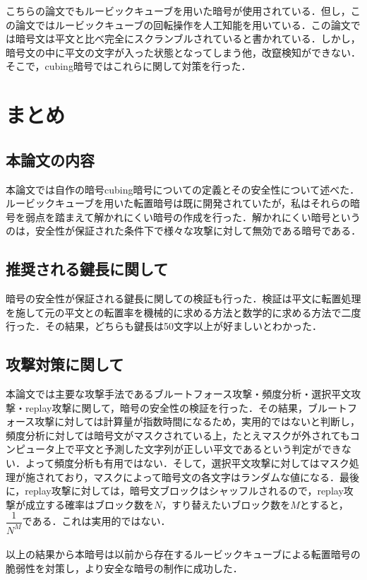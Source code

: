 \documentclass[a4p]{jarticle}
\begin{document}
こちらの論文\cite{Scrambling algorithm}でもルービックキューブを用いた暗号が使用されている．但し，この論文ではルービックキューブの回転操作を人工知能を用いている．この論文では暗号文は平文と比べ完全にスクランブルされていると書かれている．しかし，暗号文の中に平文の文字が入った状態となってしまう他，改竄検知ができない．そこで，cubing暗号ではこれらに関して対策を行った．


\section{まとめ}

\subsection{本論文の内容}
本論文では自作の暗号cubing暗号についての定義とその安全性について述べた．ルービックキューブを用いた転置暗号は既に開発されていたが，私はそれらの暗号を弱点を踏まえて解かれにくい暗号の作成を行った．解かれにくい暗号というのは，安全性が保証された条件下で様々な攻撃に対して無効である暗号である．

\subsection{推奨される鍵長に関して}
暗号の安全性が保証される鍵長に関しての検証も行った．検証は平文に転置処理を施して元の平文との転置率を機械的に求める方法と数学的に求める方法で二度行った．その結果，どちらも鍵長は50文字以上が好ましいとわかった．

\subsection{攻撃対策に関して}
本論文では主要な攻撃手法であるブルートフォース攻撃・頻度分析・選択平文攻撃・replay攻撃に関して，暗号の安全性の検証を行った．その結果，ブルートフォース攻撃に対しては計算量が指数時間になるため，実用的ではないと判断し，頻度分析に対しては暗号文がマスクされている上，たとえマスクが外されてもコンピュータ上で平文と予測した文字列が正しい平文であるという判定ができない．よって頻度分析も有用ではない．そして，選択平文攻撃に対してはマスク処理が施されており，マスクによって暗号文の各文字はランダムな値になる．最後に，replay攻撃に対しては，暗号文ブロックはシャッフルされるので，replay攻撃が成立する確率はブロック数を$N$，すり替えたいブロック数を$M$とすると，$\dfrac{1}{N^M}$である．これは実用的ではない．\\\\
以上の結果から本暗号は以前から存在するルービックキューブによる転置暗号の脆弱性を対策し，より安全な暗号の制作に成功した．
\end{document}
